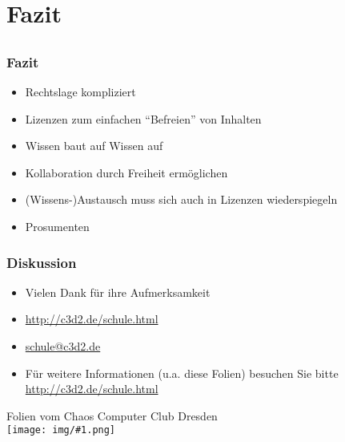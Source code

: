 \documentclass[table]{beamer}
\newcommand{\cc}[1]{\texttt{[image: img/\#1.png]}}
\begin{document}
\section{Fazit}
\subsection{}

\begin{frame}
    \frametitle{Fazit}
    \begin{itemize}
      \item Rechtslage kompliziert
      \item Lizenzen zum einfachen ``Befreien'' von Inhalten
      \item Wissen baut auf Wissen auf
      \item Kollaboration durch Freiheit ermöglichen
      \item (Wissens-)Austausch muss sich auch in Lizenzen wiederspiegeln
      \item Prosumenten
    \end{itemize}
\end{frame}

\begin{frame}
    \frametitle{Diskussion}
    \begin{itemize}
        \item Vielen Dank für ihre Aufmerksamkeit
        \item \url{http://c3d2.de/schule.html}
        \item \url{schule@c3d2.de}
        \item Für weitere Informationen (u.a. diese Folien) besuchen Sie bitte \url{http://c3d2.de/schule.html}
    \end{itemize}
    \begin{center}
   Folien vom Chaos Computer Club Dresden\\
   {\cc{by-sa}}
   \end{center}
\end{frame}
\end{document}
